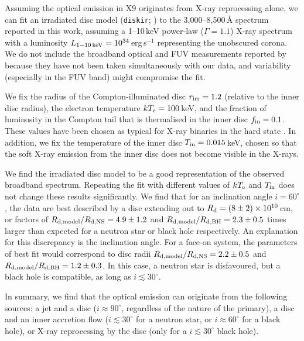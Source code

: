 \documentclass[a4paper,fleqn,usenatbib]{mnras}
\begin{document}
Assuming the optical emission in X9 originates from X-ray reprocessing alone, we can fit an irradiated disc model ({\tt diskir}; \citealp{2008MNRAS.388..753G}) to the 3,000--8,500\,{\AA} spectrum reported in this work, assuming a 1--10\,keV power-law ($\Gamma = 1.1$) X-ray spectrum with a luminosity $L_{\rm 1-10\,keV} = 10^{34}$\,erg\,s$^{-1}$ representing the unobscured corona. We do not include the broadband optical and FUV measurements reported by \citet{2008ApJ...683.1006K} because they have not been taken simultaneously with our data, and variability (especially in the FUV band) might compromise the fit.

We fix the radius of the Compton-illuminated disc $r_{\rm irr} = 1.2$ (relative to the inner disc radius), the electron temperature $kT_{\rm e} = 100$\,keV, and the fraction of luminosity in the Compton tail that is thermalised in the inner disc $f_{\rm in} = 0.1$. These values have been chosen as typical for X-ray binaries in the hard state \citep{1997MNRAS.292L..21P}. In addition, we fix the temperature of the inner disc $T_{\rm in} = 0.015$\,keV, chosen so that the soft X-ray emission from the inner disc does not become visible in the X-rays.

We find the irradiated disc model to be a good representation of the observed broadband spectrum. Repeating the fit with different values of $kT_{\rm e}$ and $T_{\rm in}$ does not change these results significantly. We find that for an inclination angle $i = 60^{\circ}$, the data are best described by a disc extending out to $R_{\rm d} = (8\pm2) \times 10^{10}$\,cm, or factors of $R_{\rm d,model}/R_{\rm d, NS} = 4.9\pm 1.2$ and $R_{\rm d,model}/R_{\rm d, BH} = 2.3 \pm 0.5$ times larger than expected for a neutron star or black hole respectively. An explanation for this discrepancy is the inclination angle. For a face-on system, the parameters of best fit would correspond to disc radii $R_{\rm d,model}/R_{\rm d, NS} = 2.2\pm 0.5$ and $R_{\rm d,model}/R_{\rm d, BH} = 1.2 \pm 0.3$. In this case, a neutron star is disfavoured, but a black hole is compatible, as long as $i \lesssim 30^{\circ}$. 

In summary, we find that the optical emission can originate from the following sources: a jet and a disc ($i \approx 90^\circ$, regardless of the nature of the primary), a disc and an inner accretion flow ($i \lesssim 30^\circ$ for a neutron star, or $i \approx 60^\circ$ for a black hole), or X-ray reprocessing by the disc (only for a $i \lesssim 30^\circ$ black hole). 
\end{document}
